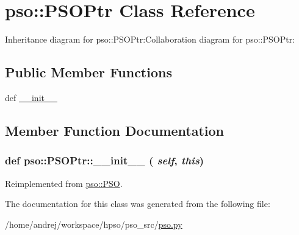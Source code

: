 \hypertarget{classpso_1_1PSOPtr}{
\section{pso::PSOPtr Class Reference}
\label{classpso_1_1PSOPtr}
}
Inheritance diagram for pso::PSOPtr:Collaboration diagram for pso::PSOPtr:\subsection*{Public Member Functions}
\begin{CompactItemize}
\item 
def \hyperlink{classpso_1_1PSOPtr_ef60e75e878d40de18fecc0758282744}{\_\-\_\-init\_\-\_\-}
\end{CompactItemize}


\subsection{Member Function Documentation}
\hypertarget{classpso_1_1PSOPtr_ef60e75e878d40de18fecc0758282744}{
\subsubsection{\setlength{\rightskip}{0pt plus 5cm}def pso::PSOPtr::\_\-\_\-init\_\-\_\- ( {\em self}, \/   {\em this})}}
\label{classpso_1_1PSOPtr_ef60e75e878d40de18fecc0758282744}




Reimplemented from \hyperlink{classpso_1_1PSO_27a5c2096805e771388694c18aba01e0}{pso::PSO}.

The documentation for this class was generated from the following file:\begin{CompactItemize}
\item 
/home/andrej/workspace/hpso/pso\_\-src/\hyperlink{pso_8py}{pso.py}\end{CompactItemize}
